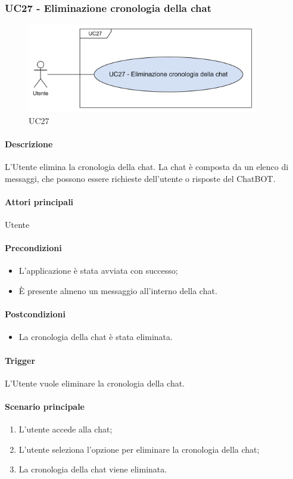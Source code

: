 \subsubsection{UC27 - Eliminazione cronologia della chat}\label{UC27}

\begin{figure}[H]
  \centering
  \includegraphics[width=0.90\textwidth]{assets/uc27.png}
  \caption{UC27}
\end{figure}

\paragraph*{Descrizione}
L'Utente elimina la cronologia della chat. La chat è composta da un elenco di messaggi, che possono essere richieste dell'utente o risposte del ChatBOT.

\paragraph*{Attori principali}
Utente

\paragraph*{Precondizioni}
\begin{itemize}
  \item L'applicazione è stata avviata con successo;
  \item È presente almeno un messaggio all'interno della chat.
\end{itemize}

\paragraph*{Postcondizioni}
\begin{itemize}
  \item La cronologia della chat è stata eliminata.
\end{itemize}

\paragraph*{Trigger}
L'Utente vuole eliminare la cronologia della chat.

\paragraph*{Scenario principale}
\begin{enumerate}
  \item L'utente accede alla chat;
  \item L'utente seleziona l'opzione per eliminare la cronologia della chat;
  \item La cronologia della chat viene eliminata.
\end{enumerate}
